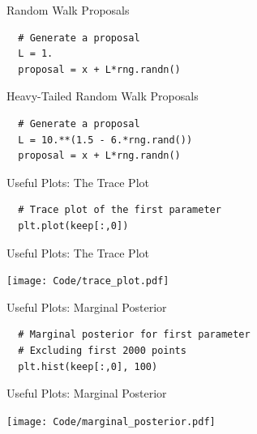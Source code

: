 \begin{frame}[t, fragile]{Random Walk Proposals}
\begin{verbatim}
  # Generate a proposal
  L = 1.
  proposal = x + L*rng.randn()
\end{verbatim}
\end{frame}

\begin{frame}[t, fragile]{Heavy-Tailed Random Walk Proposals}
\begin{verbatim}
  # Generate a proposal
  L = 10.**(1.5 - 6.*rng.rand())
  proposal = x + L*rng.randn()
\end{verbatim}
\end{frame}


\begin{frame}[t, fragile]{Useful Plots: The Trace Plot}
\begin{verbatim}
  # Trace plot of the first parameter
  plt.plot(keep[:,0])
\end{verbatim}
\end{frame}

\begin{frame}[t]{Useful Plots: The Trace Plot}
\begin{center}
\texttt{[image: Code/trace\_plot.pdf]}
\end{center}
\end{frame}


\begin{frame}[t, fragile]{Useful Plots: Marginal Posterior}
\begin{verbatim}
  # Marginal posterior for first parameter
  # Excluding first 2000 points
  plt.hist(keep[:,0], 100)
\end{verbatim}
\end{frame}

\begin{frame}[t]{Useful Plots: Marginal Posterior}
\begin{center}
\texttt{[image: Code/marginal\_posterior.pdf]}
\end{center}
\end{frame}

